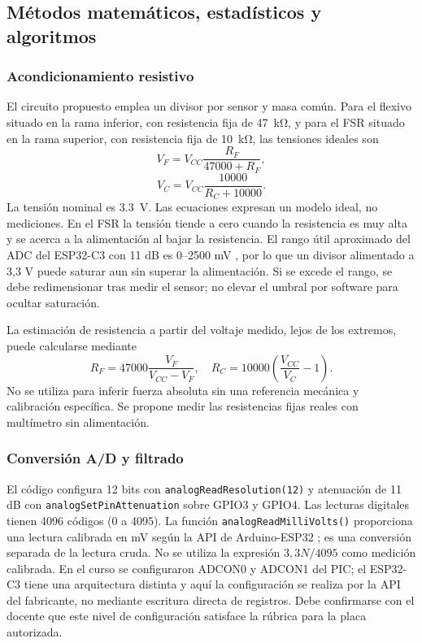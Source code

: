 \documentclass[11pt,letterpaper]{article}
\begin{document}
\subsection{Métodos matemáticos, estadísticos y algoritmos}
\subsubsection{Acondicionamiento resistivo}
El circuito propuesto emplea un divisor por sensor y masa común. Para el flexivo situado en la rama inferior, con resistencia fija de \SI{47}{\kilo\ohm}, y para el FSR situado en la rama superior, con resistencia fija de \SI{10}{\kilo\ohm}, las tensiones ideales son
\begin{equation}V_F=V_{CC}\frac{R_F}{47000+R_F},\end{equation}
\begin{equation}V_C=V_{CC}\frac{10000}{R_C+10000}.\end{equation}
La tensión nominal es \SI{3.3}{\volt}. Las ecuaciones expresan un modelo ideal, no mediciones. En el FSR la tensión tiende a cero cuando la resistencia es muy alta y se acerca a la alimentación al bajar la resistencia. El rango útil aproximado del ADC del ESP32-C3 con 11 dB es 0--2500 mV \cite{adc}, por lo que un divisor alimentado a 3,3 V puede saturar aun sin superar la alimentación. Si se excede el rango, se debe redimensionar tras medir el sensor; no elevar el umbral por software para ocultar saturación.

La estimación de resistencia a partir del voltaje medido, lejos de los extremos, puede calcularse mediante
\begin{equation}R_F=47000\frac{V_F}{V_{CC}-V_F},\quad R_C=10000\left(\frac{V_{CC}}{V_C}-1\right).\end{equation}
No se utiliza para inferir fuerza absoluta sin una referencia mecánica y calibración específica. Se propone medir las resistencias fijas reales con multímetro sin alimentación.
\subsubsection{Conversión A/D y filtrado}
El código configura 12 bits con \texttt{analogReadResolution(12)} y atenuación de 11 dB con \texttt{analogSetPinAttenuation} sobre GPIO3 y GPIO4. Las lecturas digitales tienen 4096 códigos (0 a 4095). La función \texttt{analogReadMilliVolts()} proporciona una lectura calibrada en mV según la API de Arduino-ESP32 \cite{adc}; es una conversión separada de la lectura cruda. No se utiliza la expresión $3,3N/4095$ como medición calibrada. En el curso se configuraron ADCON0 y ADCON1 del PIC; el ESP32-C3 tiene una arquitectura distinta y aquí la configuración se realiza por la API del fabricante, no mediante escritura directa de registros. Debe confirmarse con el docente que este nivel de configuración satisface la rúbrica para la placa autorizada.
\end{document}
